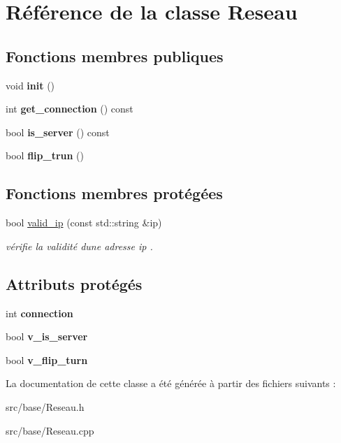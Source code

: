 \hypertarget{class_reseau}{}\section{Référence de la classe Reseau}
\label{class_reseau}
\subsection*{Fonctions membres publiques}
\begin{DoxyCompactItemize}
\item 
\mbox{\label{class_reseau_a89620a20271951433e894005be3841b4}} 
void {\bfseries init} ()
\item 
\mbox{\label{class_reseau_a60d37f0cbdfc9612c47cd3764a109533}} 
int {\bfseries get\+\_\+connection} () const
\item 
\mbox{\label{class_reseau_a28eb685fc185d8bcbfcb3cc23b97ef91}} 
bool {\bfseries is\+\_\+server} () const
\item 
\mbox{\label{class_reseau_ae8a8c3dbcfd6c771c5b7bd13079eb2e6}} 
bool {\bfseries flip\+\_\+trun} ()
\end{DoxyCompactItemize}
\subsection*{Fonctions membres protégées}
\begin{DoxyCompactItemize}
\item 
\mbox{\label{class_reseau_a01be2a7060fb903f92386ab8b37d985e}} 
bool \mbox{\hyperlink{class_reseau_a01be2a7060fb903f92386ab8b37d985e}{valid\+\_\+ip}} (const std\+::string \&ip)
\begin{DoxyCompactList}\small\item\em vérifie la validité d\textquotesingle{}une adresse ip . \end{DoxyCompactList}\end{DoxyCompactItemize}
\subsection*{Attributs protégés}
\begin{DoxyCompactItemize}
\item 
\mbox{\label{class_reseau_a92d4e0d43960bdf0b224c2de7c040e26}} 
int {\bfseries connection}
\item 
\mbox{\label{class_reseau_a06285e1858413fbf99fbffa973393018}} 
bool {\bfseries v\+\_\+is\+\_\+server}
\item 
\mbox{\label{class_reseau_a6e6d0830e491ed7b7ccb0205258a0ab7}} 
bool {\bfseries v\+\_\+flip\+\_\+turn}
\end{DoxyCompactItemize}


La documentation de cette classe a été générée à partir des fichiers suivants \+:\begin{DoxyCompactItemize}
\item 
src/base/Reseau.\+h\item 
src/base/Reseau.\+cpp\end{DoxyCompactItemize}
